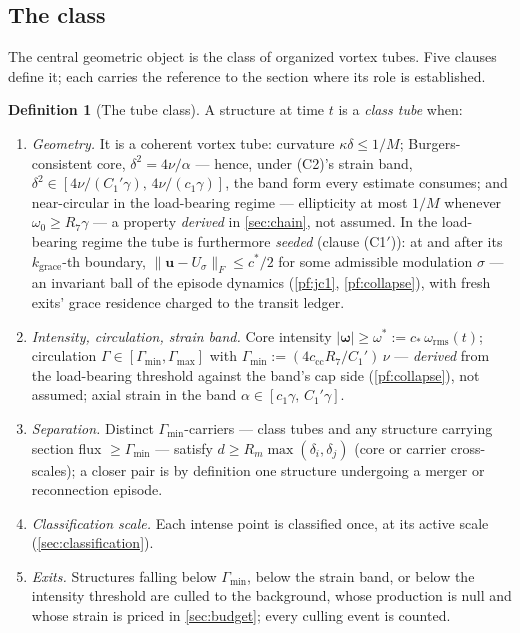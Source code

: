 \documentclass[11pt,letterpaper]{amsart}
\theoremstyle{definition}
\newtheorem{definition}[theorem]{Definition}
\theoremstyle{remark}
\newcommand{\om}{\omega}
\newcommand{\vort}{\boldsymbol{\omega}}
\newcommand{\uu}{\boldsymbol{u}}
\newcommand{\norm}[1]{\lVert #1 \rVert}
\newcommand{\abs}[1]{\lvert #1 \rvert}
\begin{document}
\subsection{The class}\label{subsec:class}
The central geometric object is the class of organized vortex tubes. Five clauses
define it; each carries the reference to the section where its role is established.

\begin{definition}[The tube class]\label{def:class}
A structure at time $t$ is a \emph{class tube} when:
\begin{enumerate}[label=\textup{(C\arabic*)},itemsep=2pt]
\item \emph{Geometry.} It is a coherent vortex tube: curvature $\kappa\delta\le1/M$;
Burgers-consistent core, $\delta^2=4\nu/\alpha$ --- hence, under \textup{(C2)}'s
strain band, $\delta^2\in[4\nu/(C_1'\gamma),\,4\nu/(c_1\gamma)]$, the band form
every estimate consumes; and near-circular in the load-bearing
regime --- ellipticity at most $1/M$ whenever $\om_0\ge R_7\gamma$ --- a property
\emph{derived} in \cref{sec:chain}, not assumed. In the load-bearing regime the
tube is furthermore \emph{seeded} (clause \textup{(C1$'$)}): at and after its
$k_{\mathrm{grace}}$-th boundary, $\norm{\uu-U_\sigma}_F\le c^*/2$ for some
admissible modulation $\sigma$ --- an invariant ball of the episode dynamics
(\cref{pf:jc1}, \cref{pf:collapse}), with fresh exits' grace residence charged
to the transit ledger.
\item \emph{Intensity, circulation, strain band.} Core intensity
$\abs{\vort}\ge\om^*:=c_*\,\om_{\mathrm{rms}}(t)$; circulation
$\Gamma\in[\Gamma_{\min},\Gamma_{\max}]$ with
$\Gamma_{\min}:=(4c_{\mathrm{cc}}R_7/C_1')\,\nu$ --- \emph{derived} from the
load-bearing threshold against the band's cap side (\cref{pf:collapse}), not
assumed; axial strain in the band
$\alpha\in[c_1\gamma,\,C_1'\gamma]$.
\item \emph{Separation.} Distinct $\Gamma_{\min}$-carriers --- class tubes and
any structure carrying section flux $\ge\Gamma_{\min}$ --- satisfy
$d\ge R_m\max(\delta_i,\delta_j)$ (core or carrier cross-scales); a closer pair
is by definition one structure undergoing a merger or reconnection episode.
\item \emph{Classification scale.} Each intense point is classified once, at its
active scale (\cref{sec:classification}).
\item \emph{Exits.} Structures falling below $\Gamma_{\min}$, below the strain band,
or below the intensity threshold are culled to the background, whose production is
null and whose strain is priced in \cref{sec:budget}; every culling event is counted.
\end{enumerate}
\end{definition}
\end{document}
